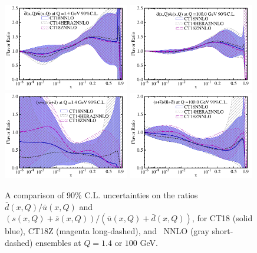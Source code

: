 \begin{figure}[tb]
	\center
	\includegraphics[width=0.49\textwidth]{./fig/dbub_1p4_CT18.pdf}
	\includegraphics[width=0.49\textwidth]{./fig/dbub_100_CT18.pdf}
	\includegraphics[width=0.49\textwidth]{./fig/Rs_1p4_CT18.pdf}
	\includegraphics[width=0.49\textwidth]{./fig/Rs_100_CT18.pdf}
	\caption{A comparison of 90\% C.L. uncertainties on the ratios
		$\bar d(x,Q)/\bar u(x,Q)$ and $\left(s(x,Q)+\bar
		s(x,Q)\right)/\left(\bar u(x,Q) +\bar d(x,Q)\right)$,
	for CT18 (solid
		blue), CT18Z (magenta long-dashed), and \CTHERAII~NNLO (gray short-dashed) ensembles
		at $Q=1.4$ or $100$ GeV.
		\label{fig:DBandSBbands}}
\end{figure}


